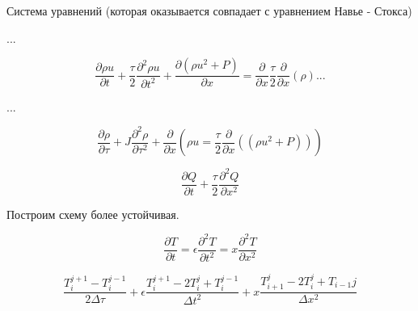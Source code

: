 \documentclass{article}
\begin{document}
Система уравнений (которая оказывается совпадает с уравнением Навье - Стокса)

...

\[ \frac{\partial \rho u }{\partial t} + \frac{\tau}{2} \frac{\partial^2 \rho u  }{\partial t^2} + \frac{\partial (\rho u^2 + P)}{\partial x} = \frac{\partial }{\partial x} \frac{\tau}{2} \frac{\partial }{\partial x} (\rho) ...\]

...



\[ \frac{\partial \rho}{\partial \tau} + J \frac{\partial^2 \rho}{\partial \tau^2} + \frac{\partial}{\partial x} (\rho u = \frac{\tau}{2} \frac{\partial }{\partial x } ((\rho u^2 + P)))  \]

\[ \frac{\partial Q }{\partial t } + \frac{\tau}{2} \frac{\partial^2 Q}{\partial x^2} \]

Построим схему более устойчивая.

\[ \frac{\partial T }{\partial t} = \epsilon \frac{\partial^2 T}{\partial t^2} = x \frac{\partial^2 T }{\partial x^2} \]

\[ \frac{T^{j+1}_{i} - T_i^{j-1}}{2 \Delta \tau} + \epsilon \frac{T_i^{j+1} - 2 T_i^j + T_i^{j-1}}{\Delta t^2} + x \frac{T^j_{i+1} - 2T_i^j+T_{i-1}{j}}{\Delta x^2} \]
\end{document}
